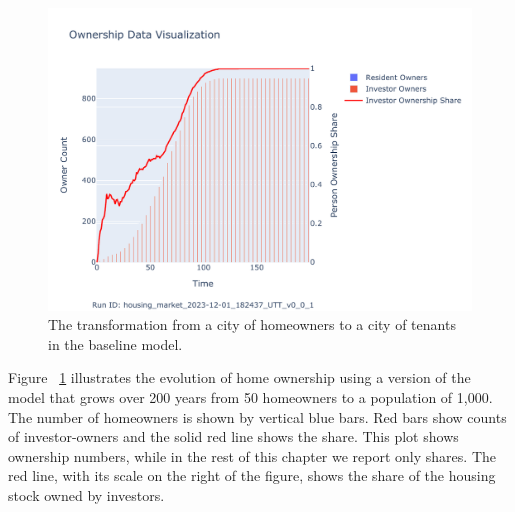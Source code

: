 \begin{figure}[h!tb]
\centering
\hspace{2cm}
\includegraphics[scale=0.9, trim={0 1cm 0 1.8cm}, clip]{fig/Analysis/Ownership_Data_1.pdf}
\caption[The ownership result]{The transformation from a city of homeowners to a city of tenants in the baseline model.}
\label{fig:Baseline_ownership_trajectory}
\end{figure}


Figure ~\ref{fig:Baseline_ownership_trajectory} illustrates the evolution of home ownership using a version of the model that grows over 200 years from 50 homeowners to a population of 1,000. The number of homeowners is shown by vertical blue bars.  Red bars show counts of investor-owners and the solid red line shows the share. This plot shows ownership numbers, while in the rest of this chapter we report only shares. %
The red line, with its scale on the right of the figure, shows the share of the housing stock owned by investors. 

